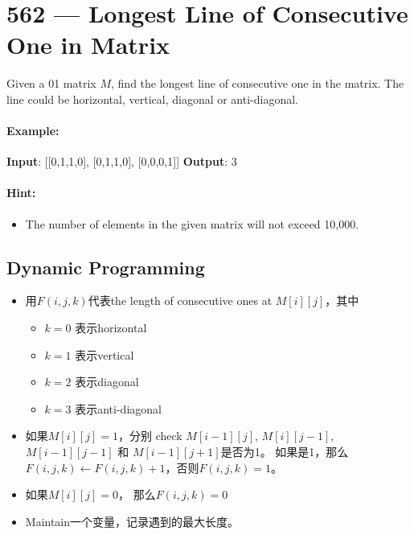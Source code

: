 \section{562 --- Longest Line of Consecutive One in Matrix}
Given a 01 matrix $M$, find the longest line of consecutive one in the matrix. The line could be horizontal, vertical, diagonal or anti-diagonal.
\paragraph{Example:}

\begin{flushleft}
\textbf{Input}:
[[0,1,1,0],
 [0,1,1,0],
 [0,0,0,1]]
\textbf{Output}: 3

\end{flushleft}

\paragraph{Hint:} 
\begin{itemize}
\item The number of elements in the given matrix will not exceed 10,000.
\end{itemize}

\subsection{Dynamic Programming}
\begin{itemize}
\item 用$F(i,j,k)$代表the length of consecutive ones at $M[i][j]$，其中
\begin{itemize}
\item $k=0$ 表示horizontal
\item $k=1$ 表示vertical
\item $k=2$ 表示diagonal
\item $k=3$ 表示anti-diagonal
\end{itemize}
\item 如果$M[i][j]=1$，分别 check $M[i-1][j]$, $M[i][j-1]$, $M[i-1][j-1]$ 和 $M[i-1][j+1]$是否为1。 如果是1，那么$F(i,j,k)\gets F(i,j,k)+1$，否则$F(i,j,k)=1$。
\item 如果$M[i][j]=0$， 那么$F(i,j,k)=0$
\item Maintain一个变量，记录遇到的最大长度。
\end{itemize}

